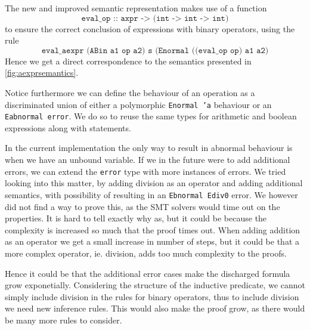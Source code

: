 The new and improved semantic representation makes use of a function
\[
  \texttt{eval\_op :: axpr -> (int -> int -> int)}
\]
to ensure the correct conclusion of expressions with binary operators, using the rule
\[
  \texttt{eval\_aexpr (ABin a1 op a2) s (Enormal ((eval\_op op) a1 a2)}
\]
Hence we get a direct correspondence to the semantics presented in
\autoref{fig:aexprsemantics}.



Notice furthermore we can define the behaviour of an operation as a discriminated union of
either a polymorphic \texttt{Enormal 'a} behaviour or an \texttt{Eabnormal error}.
We do so to reuse the same types for arithmetic and boolean expressions along with statements.

In the current implementation the only way to result in abnormal behaviour is when we have an unbound variable.
If we in the future were to add additional errors, we can extend the \texttt{error} type with more
instances of errors.
We tried looking into this matter, by adding division as an operator and adding additional semantics,
with possibility of resulting in an \texttt{Ebnormal Ediv0} error. We however did not find a way to prove this,
as the SMT solvers would time out on the properties. It is hard to tell exactly why as, but it
could be because the complexity is increased so much that the proof times out.
When adding addition as an operator we get a small increase in number of steps, but it could be
that a more complex operator, ie. division, adds too much complexity to the proofs.

Hence it could be that the additional error cases make the discharged formula grow
exponetially.
Considering the structure of the inductive predicate, we cannot simply include division in the
rules for binary operators, thus to include division we need new inference rules.
This would also make the proof grow, as there would be many more rules to consider.


